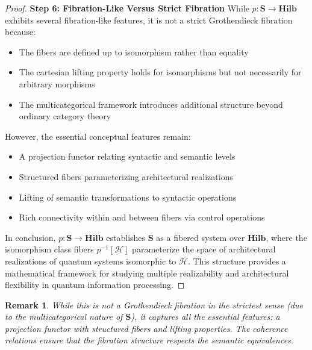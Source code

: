 \documentclass[11pt]{article}
\newtheorem{remark}{Remark}
\begin{document}
\begin{proof}
\noindent\textbf{Step 6: Fibration-Like Versus Strict Fibration}
While $p: \mathbf{S} \to \mathbf{Hilb}$ exhibits several fibration-like features, it is not a strict Grothendieck fibration because:
\begin{itemize}
    \item The fibers are defined up to isomorphism rather than equality
    \item The cartesian lifting property holds for isomorphisms but not necessarily for arbitrary morphisms
    \item The multicategorical framework introduces additional structure beyond ordinary category theory
\end{itemize}

However, the essential conceptual features remain:
\begin{itemize}
    \item A projection functor relating syntactic and semantic levels
    \item Structured fibers parameterizing architectural realizations  
    \item Lifting of semantic transformations to syntactic operations
    \item Rich connectivity within and between fibers via control operations
\end{itemize}

In conclusion, $p: \mathbf{S} \to \mathbf{Hilb}$ establishes $\mathbf{S}$ as a fibered system over $\mathbf{Hilb}$, where the isomorphism class fibers $p^{-1}[\mathcal{H}]$ parameterize the space of architectural realizations of quantum systems isomorphic to $\mathcal{H}$. This structure provides a mathematical framework for studying multiple realizability and architectural flexibility in quantum information processing.
\end{proof}


\begin{remark}
While this is not a Grothendieck fibration in the strictest sense (due to the multicategorical nature of $\mathbf{S}$), it captures all the essential features: a projection functor with structured fibers and lifting properties. The coherence relations ensure that the fibration structure respects the semantic equivalences.
\end{remark}
\end{document}
